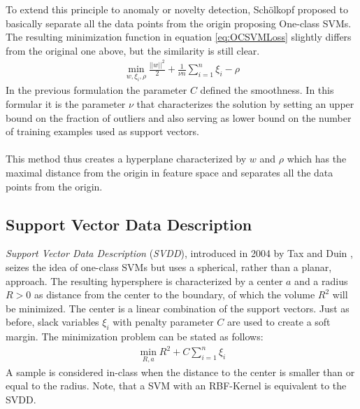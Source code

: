 \noindent To extend this principle to anomaly or novelty detection, Sch\"olkopf proposed to basically separate all the data points from the origin proposing One-class SVMs. The resulting minimization function in equation \ref{eq:OCSVMLoss} slightly differs from the original one above, but the similarity is still clear.
\begin{align}
\label{eq:OCSVMLoss}
\min_{w, \xi_i, \rho}\frac{||w||^2}{2}+\frac{1}{\nu n}\sum_{i=1}^n\xi_i-\rho
\end{align}
In the previous formulation the parameter $C$ defined the smoothness. In this formular it is the parameter $\nu$ that characterizes the solution by setting an upper bound on the fraction of outliers and also serving as lower bound on the number of training examples used as support vectors. \\
\\
This method thus creates a hyperplane characterized by $w$ and $\rho$ which has the maximal distance from the origin in feature space and separates all the data points from the origin. 

\subsection{Support Vector Data Description}
\label{subsec:SVDD}
\textit{Support Vector Data Description} (\textit{SVDD}), introduced in 2004 by Tax and Duin \cite{SVDD}, seizes the idea of one-class SVMs but uses a spherical, rather than a planar, approach. The resulting hypersphere is characterized by a center $a$ and a radius $R>0$ as distance from the center to the boundary, of which the volume $R^2$ will be minimized. The center is a linear combination of the support vectors. Just as before, slack variables $\xi_i$ with penalty parameter $C$ are used to create a soft margin. The minimization problem can be stated as follows:
\begin{align}
\label{eq:SVDD}
\min_{R, a}R^2+C\sum_{i=1}^n\xi_i
\end{align}
A sample is considered in-class when the distance to the center is smaller than or equal to the radius. Note, that a SVM with an RBF-Kernel is equivalent to the SVDD.  


